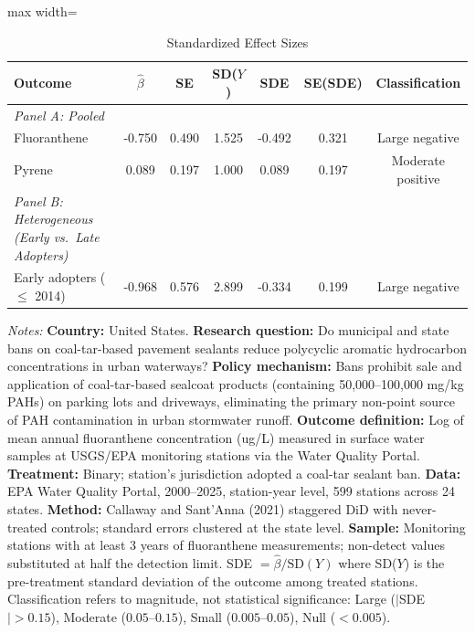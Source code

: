 \begin{table}[htbp]
\centering
\caption{Standardized Effect Sizes}
\label{tab:sde}
\small
\begin{adjustbox}{max width=\textwidth}
\begin{tabular}{lcccccc}
\toprule
Outcome & $\hat{\beta}$ & SE & SD($Y$) & SDE & SE(SDE) & Classification \\
\midrule
\textit{Panel A: Pooled} & & & & & & \\
\quad Fluoranthene & -0.750 & 0.490 & 1.525 & -0.492 & 0.321 & Large negative \\
\quad Pyrene & 0.089 & 0.197 & 1.000 & 0.089 & 0.197 & Moderate positive \\
\midrule
\textit{Panel B: Heterogeneous (Early vs.\ Late Adopters)} & & & & & & \\
\quad Early adopters ($\leq$ 2014) & -0.968 & 0.576 & 2.899 & -0.334 & 0.199 & Large negative \\
\bottomrule
\end{tabular}
\end{adjustbox}
\begin{tablenotes}
\item \textit{Notes:} \textbf{Country:} United States. \textbf{Research question:} Do municipal and state bans on coal-tar-based pavement sealants reduce polycyclic aromatic hydrocarbon concentrations in urban waterways? \textbf{Policy mechanism:} Bans prohibit sale and application of coal-tar-based sealcoat products (containing 50,000--100,000 mg/kg PAHs) on parking lots and driveways, eliminating the primary non-point source of PAH contamination in urban stormwater runoff. \textbf{Outcome definition:} Log of mean annual fluoranthene concentration (ug/L) measured in surface water samples at USGS/EPA monitoring stations via the Water Quality Portal. \textbf{Treatment:} Binary; station's jurisdiction adopted a coal-tar sealant ban. \textbf{Data:} EPA Water Quality Portal, 2000--2025, station-year level, 599 stations across 24 states. \textbf{Method:} Callaway and Sant'Anna (2021) staggered DiD with never-treated controls; standard errors clustered at the state level. \textbf{Sample:} Monitoring stations with at least 3 years of fluoranthene measurements; non-detect values substituted at half the detection limit. SDE $= \hat{\beta} / \text{SD}(Y)$ where SD($Y$) is the pre-treatment standard deviation of the outcome among treated stations. Classification refers to magnitude, not statistical significance: Large ($|$SDE$| > 0.15$), Moderate ($0.05$--$0.15$), Small ($0.005$--$0.05$), Null ($< 0.005$).
\end{tablenotes}
\end{table}

